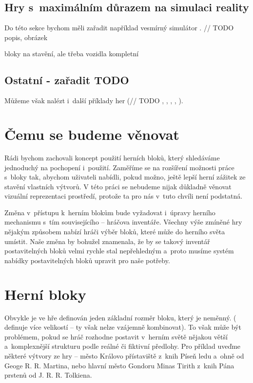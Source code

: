 \FloatBarrier


\subsection{Hry s~maximálním důrazem na simulaci reality}

Do této sekce bychom měli zařadit například vesmírný simulátor \TM{}. // TODO popis, obrázek

bloky na stavění, ale třeba vozidla kompletní

\subsection{Ostatní - zařadit TODO }

Můžeme však nalézt i~další příklady her (// TODO \TM{}, \NI{}, \PN{}, \ARK{}, \NMS{}).



\section{Čemu se budeme věnovat}

Rádi bychom zachovali koncept použití herních bloků, který shledáváme jednoduchý na pochopení i~použití. Zaměříme se na rozšíření možnosti práce s~bloky tak, abychom uživateli nabídli, pokud možno, ještě lepší herní zážitek ze stavění vlastních výtvorů. V této práci se nebudeme nijak důkladně věnovat vizuální reprezentaci prostředí, protože ta pro nás v~tuto chvíli není podstatná. 

Změna v~přístupu k~herním blokům bude vyžadovat i~úpravy herního mechanismu s~tím souvisejícího -- hráčova inventáře. Všechny výše zmíněné hry nějakým způsobem nabízí hráči výběr bloků, které může do herního světa umístit. Naše změna by bohužel znamenala, že by se takový inventář postavitelných bloků velmi rychle stal nepřehledným a~proto musíme systém nabídky postavitelných bloků upravit pro naše potřeby.

\section{Herní bloky}



Obvykle je ve hře definován jeden základní rozměr bloku, který je neměnný. (\SE{} definuje více velikostí -- ty však nelze vzájemně kombinovat). To však může být problémem, pokud se hráč rozhodne postavit v~herním světě nějakou větší a~komplexnější strukturu podle reálné či fiktivní předlohy. Pro příklad uveďme některé výtvory ze hry \MC{} -- město Královo přístaviště z~knih Píseň ledu a~ohně od Geoge R. R. Martina, nebo hlavní město Gondoru Minas Tirith z~knih Pána prstenů od J. R. R. Tolkiena.

